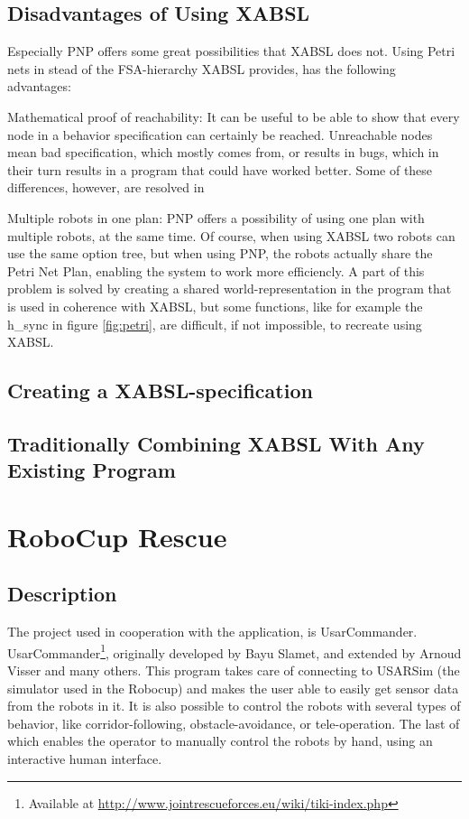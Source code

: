\documentclass[a4paper,10pt]{article}
\begin{document}
\subsection{Disadvantages of Using XABSL}
Especially PNP offers some great possibilities that XABSL does not. Using Petri
nets in stead of the FSA-hierarchy XABSL provides, has the following advantages:
\begin{itemize*}
    \item Mathematical proof of reachability: It can be useful to be able to
    show that every node in a behavior specification can certainly be reached.
    Unreachable nodes mean bad specification, which mostly comes from, or
    results in bugs, which in their turn results in a program that could have
    worked better. Some of these differences, however, are resolved in
    \cite{alur1998model}
    \item Multiple robots in one plan: PNP offers a possibility of using one
    plan with multiple robots, at the same time. Of course, when using XABSL two
    robots can use the same option tree, but when using PNP, the robots actually
    share the Petri Net Plan, enabling the system to work more efficiencly. A
    part of this problem is solved by creating a shared world-representation in
    the program that is used in coherence with XABSL, but some functions, like
    for example the h\_sync in figure \ref{fig:petri}, are difficult, if not
    impossible, to recreate using XABSL.
\end{itemize*}


\subsection{Creating a XABSL-specification}

\subsection{ Traditionally Combining XABSL With Any Existing Program}




\section{RoboCup Rescue}
\subsection{Description}
The project used in cooperation with the application, is UsarCommander.
UsarCommander\footnote{Available at
\url{http://www.jointrescueforces.eu/wiki/tiki-index.php}}, originally developed by Bayu Slamet, and extended by Arnoud
Visser and many others. This program takes care of connecting to USARSim (the
simulator used in the Robocup) and
makes the user able to easily get sensor data from the robots in it. It is also
possible to control the robots with several types of behavior, like
corridor-following, obstacle-avoidance, or tele-operation. The last of which
enables the operator to manually control the robots by hand, using an
interactive human interface.
\end{document}
